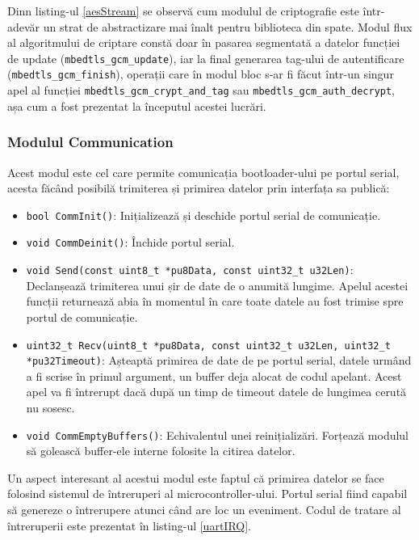 \documentclass[12pt,a4paper,titlepage]{report}
\begin{document}
Dinn listing-ul \ref{aesStream} se observă cum modulul de criptografie este într-adevăr un strat de abstractizare mai înalt pentru biblioteca din spate. Modul flux al algoritmului de criptare constă doar în pasarea segmentată a datelor funcției de update (\texttt{mbedtls\_gcm\_update}), iar la final generarea tag-ului de autentificare (\texttt{mbedtls\_gcm\_finish}), operații care în modul bloc s-ar fi făcut într-un singur apel al funcției \texttt{mbedtls\_gcm\_crypt\_and\_tag} sau \texttt{mbedtls\_gcm\_auth\_decrypt}, așa cum a fost prezentat la începutul acestei lucrări.

\subsubsection{Modulul Communication}
Acest modul este cel care permite comunicația bootloader-ului pe portul serial, acesta făcând posibilă trimiterea și primirea datelor prin interfața sa publică:
\begin{itemize}
\item \texttt{bool CommInit()}: Inițializează și deschide portul serial de comunicație.
\item \texttt{void CommDeinit()}: Închide portul serial.
\item \texttt{void Send(const uint8\_t *pu8Data, const uint32\_t u32Len)}: Declanșează trimiterea unui șir de date de o anumită lungime. Apelul acestei funcții returnează abia în momentul în care toate datele au fost trimise spre portul de comunicație.
\item \texttt{uint32\_t Recv(uint8\_t *pu8Data, const uint32\_t u32Len, uint32\_t *pu32Timeout)}: Așteaptă primirea de date de pe portul serial, datele urmând a fi scrise în primul argument, un buffer deja alocat de codul apelant. Acest apel va fi întrerupt dacă după un timp de timeout datele de lungimea cerută nu sosesc.
\item \texttt{void CommEmptyBuffers()}: Echivalentul unei reinițializări. Forțează modulul să golească buffer-ele interne folosite la citirea datelor.
\end{itemize}

Un aspect interesant al acestui modul este faptul că primirea datelor se face folosind sistemul de întreruperi al microcontroller-ului. Portul serial fiind capabil să genereze o întrerupere atunci când are loc un eveniment. Codul de tratare al întreruperii este prezentat în listing-ul \ref{uartIRQ}.
\end{document}
